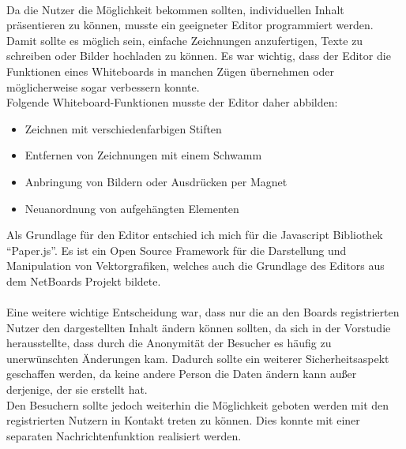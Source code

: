 \\
Da die Nutzer die Möglichkeit bekommen sollten, individuellen Inhalt präsentieren zu können, musste ein geeigneter Editor programmiert werden.
Damit sollte es möglich sein, einfache Zeichnungen anzufertigen, Texte zu schreiben oder Bilder hochladen zu können.
Es war wichtig, dass der Editor die Funktionen eines Whiteboards in manchen Zügen übernehmen oder möglicherweise sogar verbessern konnte.
\\
Folgende Whiteboard-Funktionen musste der Editor daher abbilden:
\begin{itemize}
  \item Zeichnen mit verschiedenfarbigen Stiften
  \item Entfernen von Zeichnungen mit einem Schwamm
  \item Anbringung von Bildern oder Ausdrücken per Magnet
  \item Neuanordnung von aufgehängten Elementen
\end{itemize}

Als Grundlage für den Editor entschied ich mich für die Javascript Bibliothek ``Paper.js''\cite{paperjs:website}.
Es ist ein Open Source Framework für die Darstellung und Manipulation von Vektorgrafiken, welches auch die Grundlage des Editors aus dem NetBoards Projekt bildete\cite{wood:2014}.
\\
\\
Eine weitere wichtige Entscheidung war, dass nur die an den Boards registrierten Nutzer den dargestellten Inhalt ändern können sollten, da sich in der Vorstudie herausstellte, dass durch die Anonymität der Besucher es häufig zu unerwünschten Änderungen kam.
Dadurch sollte ein weiterer Sicherheitsaspekt geschaffen werden, da keine andere Person die Daten ändern kann außer derjenige, der sie erstellt hat.
\\
Den Besuchern sollte jedoch weiterhin die Möglichkeit geboten werden mit den registrierten Nutzern in Kontakt treten zu können. Dies konnte mit einer separaten Nachrichtenfunktion realisiert werden.

